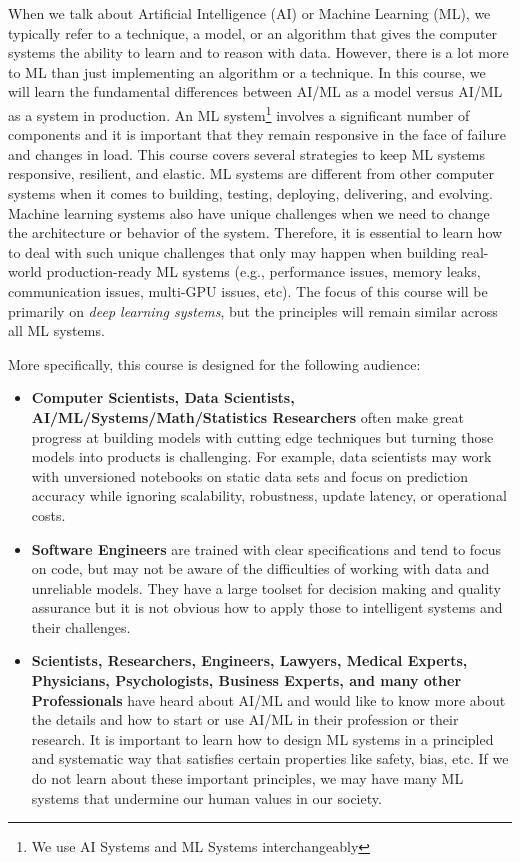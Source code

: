 \documentclass[11pt]{article}
\begin{document}
When we talk about Artificial Intelligence (AI) or Machine Learning (ML), we typically refer to a technique, a model, or an algorithm that gives the computer systems the ability to learn and to reason with data. However, there is a lot more to ML than just implementing an algorithm or a technique. In this course, we will learn the fundamental differences between AI/ML as a model versus AI/ML as a system in production. An ML system\footnote{We use AI Systems and ML Systems interchangeably} involves a significant number of components and it is important that they remain responsive in the face of failure and changes in load. This course covers several strategies to keep ML systems responsive, resilient, and elastic. ML systems are different from other computer systems when it comes to building, testing, deploying, delivering, and evolving. Machine learning systems also have unique challenges when we need to change the architecture or behavior of the system. Therefore, it is essential to learn how to deal with such unique challenges that only may happen when building real-world production-ready ML systems (e.g., performance issues, memory leaks, communication issues, multi-GPU issues, etc). The focus of this course will be primarily on \emph{deep learning systems}, but the principles will remain similar across all ML systems. 

More specifically, this course is designed for the following audience:

\begin{itemize}

\item \textbf{Computer Scientists, Data Scientists, AI/ML/Systems/Math/Statistics Researchers} often make great progress at building models with cutting edge techniques but turning those models into products is challenging. For example, data scientists may work with unversioned notebooks on static data sets and focus on prediction accuracy while ignoring scalability, robustness, update latency, or operational costs.

\item \textbf{Software Engineers} are trained with clear specifications and tend to focus on code, but may not be aware of the difficulties of working with data and unreliable models. They have a large toolset for decision making and quality assurance but it is not obvious how to apply those to intelligent systems and their challenges. 

\item \textbf{Scientists, Researchers, Engineers, Lawyers, Medical Experts, Physicians, Psychologists, Business Experts, and many other Professionals} have heard about AI/ML and would like to know more about the details and how to start or use AI/ML in their profession or their research. It is important to learn how to design ML systems in a principled and systematic way that satisfies certain properties like safety, bias, etc. If we do not learn about these important principles, we may have many ML systems that undermine our human values in our society.

\end{itemize}
\end{document}
